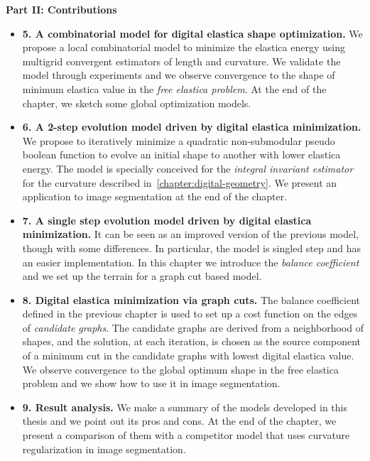 \begin{itemize}
\end{itemize}

\textbf{Part II: Contributions}
\begin{itemize}
\item[]{\textbf{5. A combinatorial model for digital elastica shape optimization.} We propose a local combinatorial model to minimize the elastica energy using multigrid convergent estimators of length and curvature. We validate the model through experiments and we observe convergence to the shape of minimum elastica value in the \emph{free elastica problem}. At the end of the chapter, we sketch some global optimization models.}
\item[]{\textbf{6. A 2-step evolution model driven by digital elastica minimization.} We propose to iteratively minimize a quadratic non-submodular pseudo boolean function to evolve an initial shape to another with lower elastica energy. The model is specially conceived for the \emph{integral invariant estimator} for the curvature described in~\cref{chapter:digital-geometry}. We present an application to image segmentation at the end of the chapter. }
\item[]{\textbf{7. A single step evolution model driven by digital elastica minimization.} It can be seen as an improved version of the previous model, though with some differences. In particular, the model is singled step and has an easier implementation. In this chapter we introduce the \emph{balance coefficient} and we set up the terrain for a graph cut based model.}
\item[]{\textbf{8. Digital elastica minimization via graph cuts.} The balance coefficient defined in the previous chapter is used to set up a cost function on the edges of \emph{candidate graphs}. The candidate graphs are derived from a neighborhood of shapes, and the solution, at each iteration, is chosen as the source component of a minimum cut in the candidate graphs with lowest digital elastica value. We observe convergence to the global optimum shape in the free elastica problem and we show how to use it in image segmentation. }
\item[]{\textbf{9. Result analysis.} We make a summary of the models developed in this thesis and we point out its pros and cons. At the end of the chapter, we present a comparison of them with a competitor model that uses curvature regularization in image segmentation. }
\end{itemize}

